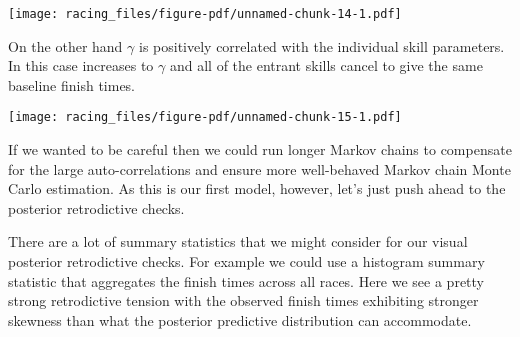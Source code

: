 \documentclass[
  letterpaper,
  DIV=11,
  numbers=noendperiod]{scrartcl}
\newenvironment{Shaded}{\begin{snugshade}}{\end{snugshade}}
\newcommand{\FunctionTok}[1]{\textcolor[rgb]{0.28,0.35,0.67}{#1}}
\newcommand{\NormalTok}[1]{\textcolor[rgb]{0.00,0.23,0.31}{#1}}
\newcommand{\SpecialCharTok}[1]{\textcolor[rgb]{0.37,0.37,0.37}{#1}}
\newcommand{\StringTok}[1]{\textcolor[rgb]{0.13,0.47,0.30}{#1}}
\begin{document}
\begin{Shaded}
\end{Shaded}

\texttt{[image: racing\_files/figure-pdf/unnamed-chunk-14-1.pdf]}

On the other hand \(\gamma\) is positively correlated with the
individual skill parameters. In this case increases to \(\gamma\) and
all of the entrant skills cancel to give the same baseline finish times.

\begin{Shaded}
\end{Shaded}

\texttt{[image: racing\_files/figure-pdf/unnamed-chunk-15-1.pdf]}

If we wanted to be careful then we could run longer Markov chains to
compensate for the large auto-correlations and ensure more well-behaved
Markov chain Monte Carlo estimation. As this is our first model,
however, let's just push ahead to the posterior retrodictive checks.

There are a lot of summary statistics that we might consider for our
visual posterior retrodictive checks. For example we could use a
histogram summary statistic that aggregates the finish times across all
races. Here we see a pretty strong retrodictive tension with the
observed finish times exhibiting stronger skewness than what the
posterior predictive distribution can accommodate.
\end{document}
